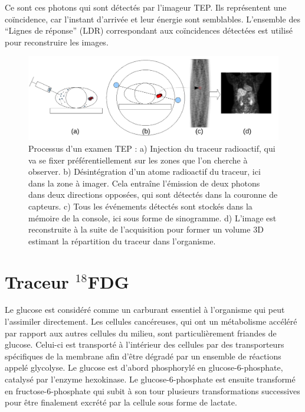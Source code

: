 Ce sont ces photons qui sont détectés par l'imageur TEP. Ils représentent une coïncidence, car l'instant d'arrivée et leur énergie sont semblables. L'ensemble des ``Lignes de réponse'' (LDR) correspondant aux coïncidences détectées est utilisé pour reconstruire les images.

\begin{figure}
\centering
\includegraphics[width=16cm]{images/schemaTEP}
\caption[Présentation simplifiée de la TEP]{Processus d'un examen TEP : a) Injection du traceur radioactif, qui va se fixer préférentiellement sur les zones que l'on cherche à observer. b) Désintégration d'un atome radioactif du traceur, ici dans la zone à imager. Cela entraîne l'émission de deux photons dans deux directions opposées, qui sont détectés dans la couronne de capteurs. c) Tous les événements détectés sont stockés dans la mémoire de la console, ici sous forme de sinogramme. d) L'image est reconstruite à la suite de l'acquisition pour former un volume 3D estimant la répartition du traceur dans l'organisme.}
\label{fig:schemaTEP}
\end{figure}


\section{Traceur $^{18}$FDG}

Le glucose est considéré comme un carburant essentiel à l’organisme qui peut l’assimiler directement. Les cellules cancéreuses, qui ont un métabolisme accéléré par rapport aux autres cellules du milieu, sont particulièrement friandes de glucose. Celui-ci est transporté à l’intérieur des cellules par des transporteurs spécifiques de la membrane afin d’être dégradé par un ensemble de réactions appelé glycolyse. Le glucose est d’abord phosphorylé en glucose-6-phosphate, catalysé par l’enzyme hexokinase. Le glucose-6-phosphate est ensuite transformé en fructose-6-phosphate qui subit à son tour plusieurs transformations successives pour être finalement excrété par la cellule sous forme de lactate.

